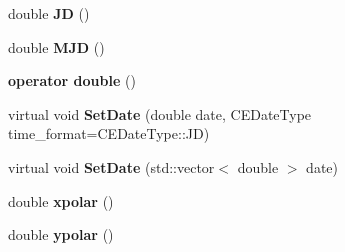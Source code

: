 \begin{DoxyCompactItemize}
\item 
\hypertarget{class_c_e_date_ae2037afc1279464fa1224b81226a3c41}{}double {\bfseries J\+D} ()\label{class_c_e_date_ae2037afc1279464fa1224b81226a3c41}

\item 
\hypertarget{class_c_e_date_a587a14c0515697ef8c976ee8b67f40e4}{}double {\bfseries M\+J\+D} ()\label{class_c_e_date_a587a14c0515697ef8c976ee8b67f40e4}

\item 
\hypertarget{class_c_e_date_ae0654fdee3514c55117260bbf499839f}{}{\bfseries operator double} ()\label{class_c_e_date_ae0654fdee3514c55117260bbf499839f}

\item 
\hypertarget{class_c_e_date_acb27bd568466f1cd2f497df356c3ed70}{}virtual void {\bfseries Set\+Date} (double date, C\+E\+Date\+Type time\+\_\+format=C\+E\+Date\+Type\+::\+J\+D)\label{class_c_e_date_acb27bd568466f1cd2f497df356c3ed70}

\item 
\hypertarget{class_c_e_date_a0afe9b5144dc4ed63ef78917f426855e}{}virtual void {\bfseries Set\+Date} (std\+::vector$<$ double $>$ date)\label{class_c_e_date_a0afe9b5144dc4ed63ef78917f426855e}

\item 
\hypertarget{class_c_e_date_a4a9004a8c1e7a5e64a5c567e09a7c521}{}double {\bfseries xpolar} ()\label{class_c_e_date_a4a9004a8c1e7a5e64a5c567e09a7c521}

\item 
\hypertarget{class_c_e_date_adef63e77a091d4bfdddff56b7aa06411}{}double {\bfseries ypolar} ()\label{class_c_e_date_adef63e77a091d4bfdddff56b7aa06411}

\end{DoxyCompactItemize}
